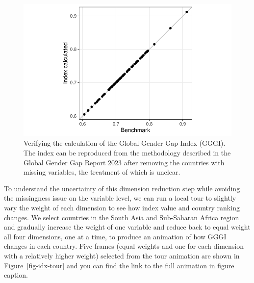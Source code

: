 \documentclass[
]{interact}
\begin{document}
\begin{figure}

{\centering \includegraphics{tidyindex_files/figure-pdf/fig-compare-gggi-1.pdf}

}

\caption{\label{fig-compare-gggi}Verifying the calculation of the Global
Gender Gap Index (GGGI). The index can be reproduced from the
methodology described in the Global Gender Gap Report 2023 after
removing the countries with missing variables, the treatment of which is
unclear.}

\end{figure}

To understand the uncertainty of this dimension reduction step while
avoiding the missingness issue on the variable level, we can run a local
tour to slightly vary the weight of each dimension to see how index
value and country ranking changes. We select countries in the South Asia
and Sub-Saharan Africa region and gradually increase the weight of one
variable and reduce back to equal weight all four dimensions, one at a
time, to produce an animation of how GGGI changes in each country. Five
frames (equal weights and one for each dimension with a relatively
higher weight) selected from the tour animation are shown in
Figure~\ref{fig-idx-tour} and you can find the link to the full
animation in figure caption.
\end{document}
